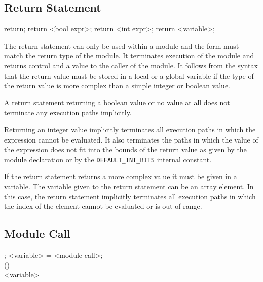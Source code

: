 \documentclass[a4paper,11pt,titlepage,english]{article}
\begin{document}
\subsection{Return Statement\label{s:return}}

\begin{bnfgrammar}
 \is return;
    \or return <bool expr>;
    \or return <int expr>;
    \or return <variable>;
    \\
\end{bnfgrammar}

The return statement can only be used within a module and the form must
match the return type of the module. It terminates execution of the module
and returns control and a value to the caller of the module. It follows
from the syntax that the return value must be stored in a local or a global
variable if the type of the return value is more complex than a simple
integer or boolean value.

A return statement returning a boolean value or no value at all does not
terminate any execution paths implicitly.

Returning an integer value implicitly terminates all execution paths in
which the expression cannot be evaluated. It also terminates the paths in
which the value of the expression does not fit into the bounds of the
return value as given by the module declaration or by the
\verb|DEFAULT_INT_BITS| internal constant.

If the return statement returns a more complex value it must be given in
a variable. The variable given to the return statement can be an array
element. In this case, the return statement implicitly terminates all
execution paths in which the index of the element cannot be evaluated or is
out of range.

\subsection{Module Call\label{s:call}}

\begin{bnfgrammar}
 ;
    \or <variable> = <module call>; \\
[module call]  () \\
[argument] \is <variable>   \\
\end{bnfgrammar}
\end{document}
